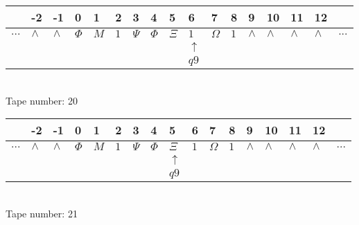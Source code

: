 \documentclass{article}
\begin{document}
\begin{table}[H]
\centering
\begin{tabular}{lllllllllllllllll}
 & -2 & -1 & 0 & 1 & 2 & 3 & 4 & 5 & 6 & 7 & 8 & 9 & 10 & 11 & 12 & \\
\hline
$...$ & \multicolumn{1}{|l|}{$\wedge$} & \multicolumn{1}{|l|}{$\wedge$} & \multicolumn{1}{|l|}{$\Phi$} & \multicolumn{1}{|l|}{$M$} & \multicolumn{1}{|l|}{$1$} & \multicolumn{1}{|l|}{$\Psi$} & \multicolumn{1}{|l|}{$\Phi$} & \multicolumn{1}{|l|}{$\Xi$} & \multicolumn{1}{|l|}{$1$} & \multicolumn{1}{|l|}{$\Omega$} & \multicolumn{1}{|l|}{$1$} & \multicolumn{1}{|l|}{$\wedge$} & \multicolumn{1}{|l|}{$\wedge$} & \multicolumn{1}{|l|}{$\wedge$} & \multicolumn{1}{|l|}{$\wedge$} & $...$\\
\hline
&  &  &  &  &  &  &  &  & $\uparrow$ &  &  &  &  &  &  &  \\
&  &  &  &  &  &  &  &  & $ q9 $ &  &  &  &  &  &  &  \\
\end{tabular}
\\
Tape number: 20
\noindent\makebox[\linewidth]{\hdashrule{\textwidth}{1pt}{1pt}}\end{table}

\begin{table}[H]
\centering
\begin{tabular}{lllllllllllllllll}
 & -2 & -1 & 0 & 1 & 2 & 3 & 4 & 5 & 6 & 7 & 8 & 9 & 10 & 11 & 12 & \\
\hline
$...$ & \multicolumn{1}{|l|}{$\wedge$} & \multicolumn{1}{|l|}{$\wedge$} & \multicolumn{1}{|l|}{$\Phi$} & \multicolumn{1}{|l|}{$M$} & \multicolumn{1}{|l|}{$1$} & \multicolumn{1}{|l|}{$\Psi$} & \multicolumn{1}{|l|}{$\Phi$} & \multicolumn{1}{|l|}{$\Xi$} & \multicolumn{1}{|l|}{$1$} & \multicolumn{1}{|l|}{$\Omega$} & \multicolumn{1}{|l|}{$1$} & \multicolumn{1}{|l|}{$\wedge$} & \multicolumn{1}{|l|}{$\wedge$} & \multicolumn{1}{|l|}{$\wedge$} & \multicolumn{1}{|l|}{$\wedge$} & $...$\\
\hline
&  &  &  &  &  &  &  & $\uparrow$ &  &  &  &  &  &  &  &  \\
&  &  &  &  &  &  &  & $ q9 $ &  &  &  &  &  &  &  &  \\
\end{tabular}
\\
Tape number: 21
\noindent\makebox[\linewidth]{\hdashrule{\textwidth}{1pt}{1pt}}\end{table}
\end{document}
